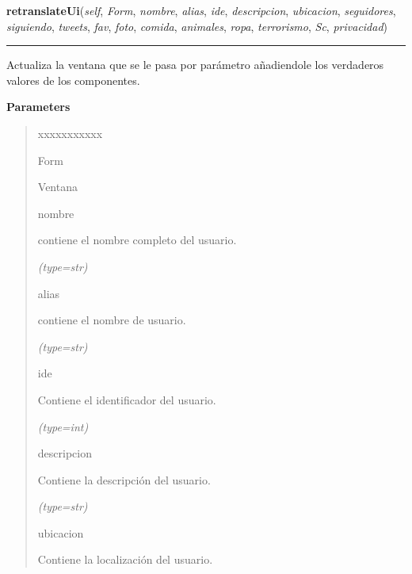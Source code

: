 \hspace{.8\funcindent}\begin{boxedminipage}{\funcwidth}

    \raggedright \textbf{retranslateUi}(\textit{self}, \textit{Form}, \textit{nombre}, \textit{alias}, \textit{ide}, \textit{descripcion}, \textit{ubicacion}, \textit{seguidores}, \textit{siguiendo}, \textit{tweets}, \textit{fav}, \textit{foto}, \textit{comida}, \textit{animales}, \textit{ropa}, \textit{terrorismo}, \textit{Sc}, \textit{privacidad})

    \vspace{-1.5ex}

    \rule{\textwidth}{0.5\fboxrule}
\setlength{\parskip}{2ex}
    Actualiza la ventana que se le pasa por parámetro añadiendole los 
    verdaderos valores de los componentes.

\setlength{\parskip}{1ex}
      \textbf{Parameters}
      \vspace{-1ex}

      \begin{quote}
        \begin{Ventry}{xxxxxxxxxxx}

          \item[Form]

          Ventana

          \item[nombre]

          contiene el nombre completo del usuario.

            {\it (type=str)}

          \item[alias]

          contiene el nombre de usuario.

            {\it (type=str)}

          \item[ide]

          Contiene el identificador del usuario.

            {\it (type=int)}

          \item[descripcion]

          Contiene la descripción del usuario.

            {\it (type=str)}

          \item[ubicacion]

          Contiene la localización del usuario.


\end{Ventry}
\end{quote}
\end{boxedminipage}
